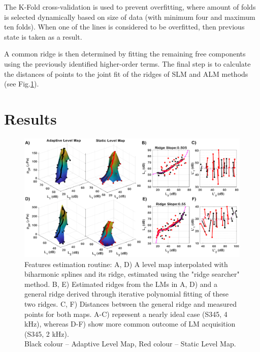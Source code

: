 \documentclass[journal,twoside,web]{ieeecolor2}
\begin{document}
The K-Fold cross-validation is used to prevent overfitting, where amount of folds is selected dynamically based on size of data (with minimum four and maximum ten folds). When one of the lines is considered to be overfitted, then previous state is taken as a result.

A common ridge is then determined by fitting the remaining free components using the previously identified higher-order terms. The final step is to calculate the distances of points to the joint fit of the ridges of SLM and ALM methods (see Fig.\ref{fig_BLK}).

\section{Results}

\begin{figure}
\includegraphics[width=\textwidth]{Fig_5_assembly2.eps} %
\caption{Features estimation routine: A, D) A level map interpolated with biharmonic splines and its ridge, estimated using the "ridge searcher" method. B, E) Estimated ridges from the LMs in A, D) and a general ridge derived through iterative polynomial fitting of these two ridges. C, F) Distances between the general ridge and measured points for both maps. A-C) represent a nearly ideal case (S345, 4 kHz), whereas D-F) show more common outcome of LM acquisition (S345, 2 kHz).\\ Black colour – Adaptive Level Map, Red colour – Static Level Map.}
\label{fig_BLK}
\end{figure}
\end{document}
